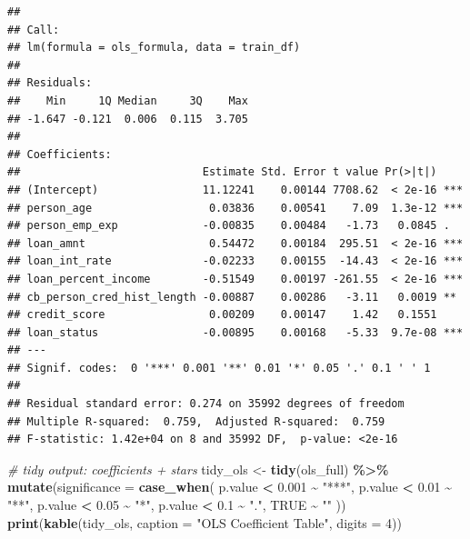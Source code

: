 \documentclass[
]{article}
\newenvironment{Shaded}{\begin{snugshade}}{\end{snugshade}}
\newcommand{\AttributeTok}[1]{\textcolor[rgb]{0.13,0.29,0.53}{#1}}
\newcommand{\CommentTok}[1]{\textcolor[rgb]{0.56,0.35,0.01}{\textit{#1}}}
\newcommand{\ConstantTok}[1]{\textcolor[rgb]{0.56,0.35,0.01}{#1}}
\newcommand{\DecValTok}[1]{\textcolor[rgb]{0.00,0.00,0.81}{#1}}
\newcommand{\FloatTok}[1]{\textcolor[rgb]{0.00,0.00,0.81}{#1}}
\newcommand{\FunctionTok}[1]{\textcolor[rgb]{0.13,0.29,0.53}{\textbf{#1}}}
\newcommand{\NormalTok}[1]{#1}
\newcommand{\OtherTok}[1]{\textcolor[rgb]{0.56,0.35,0.01}{#1}}
\newcommand{\SpecialCharTok}[1]{\textcolor[rgb]{0.81,0.36,0.00}{\textbf{#1}}}
\newcommand{\StringTok}[1]{\textcolor[rgb]{0.31,0.60,0.02}{#1}}
\begin{document}
\begin{verbatim}
## 
## Call:
## lm(formula = ols_formula, data = train_df)
## 
## Residuals:
##    Min     1Q Median     3Q    Max 
## -1.647 -0.121  0.006  0.115  3.705 
## 
## Coefficients:
##                            Estimate Std. Error t value Pr(>|t|)    
## (Intercept)                11.12241    0.00144 7708.62  < 2e-16 ***
## person_age                  0.03836    0.00541    7.09  1.3e-12 ***
## person_emp_exp             -0.00835    0.00484   -1.73   0.0845 .  
## loan_amnt                   0.54472    0.00184  295.51  < 2e-16 ***
## loan_int_rate              -0.02233    0.00155  -14.43  < 2e-16 ***
## loan_percent_income        -0.51549    0.00197 -261.55  < 2e-16 ***
## cb_person_cred_hist_length -0.00887    0.00286   -3.11   0.0019 ** 
## credit_score                0.00209    0.00147    1.42   0.1551    
## loan_status                -0.00895    0.00168   -5.33  9.7e-08 ***
## ---
## Signif. codes:  0 '***' 0.001 '**' 0.01 '*' 0.05 '.' 0.1 ' ' 1
## 
## Residual standard error: 0.274 on 35992 degrees of freedom
## Multiple R-squared:  0.759,  Adjusted R-squared:  0.759 
## F-statistic: 1.42e+04 on 8 and 35992 DF,  p-value: <2e-16
\end{verbatim}

\begin{Shaded}
\begin{Highlighting}[]
\CommentTok{\# tidy output: coefficients + stars}
\NormalTok{tidy\_ols }\OtherTok{\textless{}{-}} \FunctionTok{tidy}\NormalTok{(ols\_full) }\SpecialCharTok{\%\textgreater{}\%}
  \FunctionTok{mutate}\NormalTok{(}\AttributeTok{significance =} \FunctionTok{case\_when}\NormalTok{(}
\NormalTok{    p.value }\SpecialCharTok{\textless{}} \FloatTok{0.001} \SpecialCharTok{\textasciitilde{}} \StringTok{"***"}\NormalTok{,}
\NormalTok{    p.value }\SpecialCharTok{\textless{}} \FloatTok{0.01}  \SpecialCharTok{\textasciitilde{}} \StringTok{"**"}\NormalTok{,}
\NormalTok{    p.value }\SpecialCharTok{\textless{}} \FloatTok{0.05}  \SpecialCharTok{\textasciitilde{}} \StringTok{"*"}\NormalTok{,}
\NormalTok{    p.value }\SpecialCharTok{\textless{}} \FloatTok{0.1}   \SpecialCharTok{\textasciitilde{}} \StringTok{"."}\NormalTok{,}
    \ConstantTok{TRUE}            \SpecialCharTok{\textasciitilde{}} \StringTok{""}
\NormalTok{  ))}
\FunctionTok{print}\NormalTok{(}\FunctionTok{kable}\NormalTok{(tidy\_ols, }\AttributeTok{caption =} \StringTok{"OLS Coefficient Table"}\NormalTok{, }\AttributeTok{digits =} \DecValTok{4}\NormalTok{))}
\end{Highlighting}
\end{Shaded}
\end{document}
